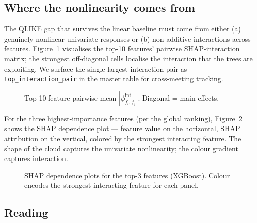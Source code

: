 \subsection{Where the nonlinearity comes from}
\label{sec:tree_story_interactions}

The QLIKE gap that survives the linear baseline must come from
either (a) genuinely nonlinear univariate responses or (b)
non-additive interactions across features. Figure~\ref{fig:shap_interaction_heatmap}
visualises the top-10 features' pairwise SHAP-interaction matrix; the
strongest off-diagonal cells localise the interaction that the trees
are exploiting. We surface the single largest interaction pair as
\texttt{top\_interaction\_pair} in the master table for cross-meeting
tracking.

\begin{figure}[H]
\centering
\hfill
{}
\caption{Top-10 feature pairwise mean $|\phi^{\text{int}}_{f_i,f_j}|$.
Diagonal = main effects.}
\label{fig:shap_interaction_heatmap}
\end{figure}

For the three highest-importance features (per the global
ranking), Figure~\ref{fig:shap_dependence} shows the SHAP dependence
plot --- feature value on the horizontal, SHAP attribution on the
vertical, colored by the strongest interacting feature. The shape of
the cloud captures the univariate nonlinearity; the colour gradient
captures interaction.

\begin{figure}[H]
\centering
\hfill
{}\hfill
{}
\caption{SHAP dependence plots for the top-3 features (XGBoost). Colour
encodes the strongest interacting feature for each panel.}
\label{fig:shap_dependence}
\end{figure}

\subsection{Reading}
\label{sec:tree_story_reading}

